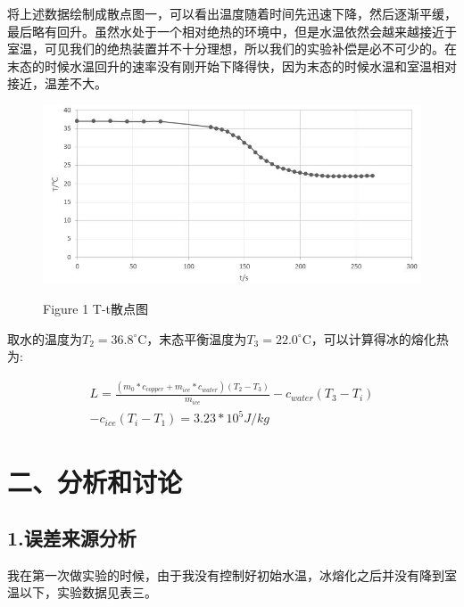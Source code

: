 \documentclass[a4paper,10pt,notitlepage]{report}
\begin{document}
	将上述数据绘制成散点图一，可以看出温度随着时间先迅速下降，然后逐渐平缓，最后略有回升。虽然水处于一个相对绝热的环境中，但是水温依然会越来越接近于室温，可见我们的绝热装置并不十分理想，所以我们的实验补偿是必不可少的。在末态的时候水温回升的速率没有刚开始下降得快，因为末态的时候水温和室温相对接近，温差不大。 \\
	
\begin{figure}[htbp]
\centering

	\includegraphics[scale=.6]{1.jpg}
	\begin{center}
		\scriptsize Figure 1 T-t散点图
	\end{center}

\end{figure}
	
	取水的温度为$T_2 = 36.8 ^{\circ}$C，末态平衡温度为$T_3 = 22.0^{\circ}$C，可以计算得冰的熔化热为:
	
\begin{align*}
	L = \frac{(m_0 * c_{copper} + m_{ice} * c_{water})(T_2 - T_3)}{m_{ice}} - c_{water}(T_3 - T_i) \\
	- c_{ice}(T_i - T_1) = 3.23 * 10^5 J/kg
\end{align*}

\section*{二、分析和讨论}
\subsection*{1.误差来源分析}
	
	我在第一次做实验的时候，由于我没有控制好初始水温，冰熔化之后并没有降到室温以下，实验数据见表三。
	
\end{document}
